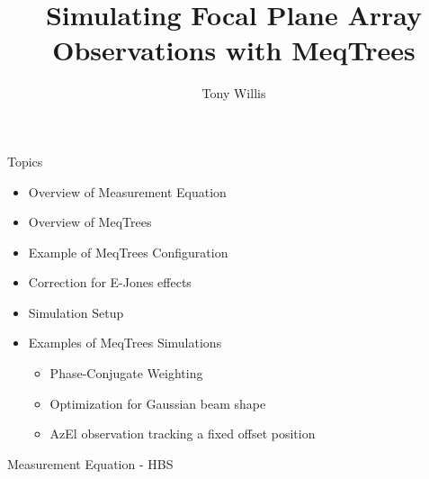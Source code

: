 \documentclass[pdf,azure,slideColor,colorBG]{prosper}
\title{Simulating Focal Plane Array Observations with MeqTrees}
\author{\green Tony Willis}
\begin{document}
\maketitle


\begin{slide}{Topics}
\begin{small}
\begin{itemize}
\item Overview of Measurement Equation
\item Overview of MeqTrees
\item Example of MeqTrees Configuration
\item Correction for E-Jones effects
\item Simulation Setup
\item Examples of MeqTrees Simulations
\begin{itemize}
\item Phase-Conjugate Weighting
\item Optimization for Gaussian beam shape
\item AzEl observation tracking a fixed offset position
\end{itemize}
\end{itemize}
\end{small}
\end{slide}

\begin{slide}{Measurement Equation - HBS}
{\centering
{}
\par}
\end{slide}
\end{document}
